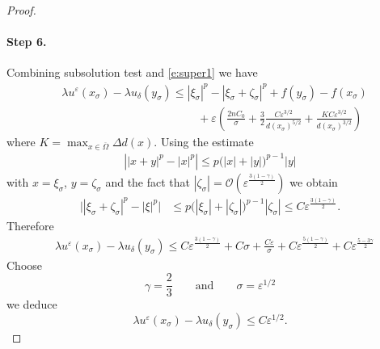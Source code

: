 \documentclass[11pt,reqno]{amsart}
\numberwithin{figure}{section}
\theoremstyle{plain}
\theoremstyle{remark}
\numberwithin{equation}{section}
\begin{document}
\begin{proof}
\paragraph{Step 6.} Combining subsolution test and \eqref{e:super1} we have
\begin{align}
    &\lambda u^\varepsilon(x_\sigma) - \lambda u_\delta(y_\sigma) \leq |\xi_\sigma|^p - |\xi_\sigma+\zeta_\sigma|^p + f(y_\sigma) - f(x_\sigma) \nonumber \\
    & \qquad\qquad\qquad\qquad\qquad\qquad + \varepsilon \left(\frac{2nC_0}{\sigma} + \frac{3}{2}\frac{C\varepsilon^{3/2}}{d(x_\sigma)^{5/2}} + \frac{KC\varepsilon^{3/2}}{d(x_\sigma)^{3/2}}\right) 
\end{align}
where $K = \max_{x\in \overline{\Omega}}\Delta d(x)$. Using the estimate
\begin{align*}
    \left||x+y|^p - |x|^p \right| \leq  p\big(|x|+|y|\big)^{p-1}|y|
\end{align*}
with $x = \xi_\sigma$, $y = \zeta_\sigma$ and the fact that $|\zeta_\sigma| = \mathcal{O}\left(\varepsilon^{\frac{3(1-\gamma)}{2}}\right)$ we obtain
\begin{align}
    \Big||\xi_\sigma+\zeta_\sigma|^p - |\xi|^p\Big| &\leq p\Big(|\xi_\sigma|+|\zeta_\sigma|\Big)^{p-1}|\zeta_\sigma| \leq C\varepsilon^{\frac{3(1-\gamma)}{2}}.\label{e:est2}
\end{align}
Therefore
\begin{align*}
     &\lambda u^\varepsilon(x_\sigma) - \lambda u_\delta(y_\sigma) \leq C\varepsilon^{\frac{3(1-\gamma)}{2}} + C\sigma + \frac{C\varepsilon}{\sigma} + C \varepsilon^{\frac{5(1-\gamma)}{2}} + C\varepsilon ^{\frac{5-3\gamma}{2}}
\end{align*}
Choose 
\begin{equation*}
    \gamma = \frac{2}{3} \qquad\text{and}\qquad \sigma = \varepsilon^{1/2}
\end{equation*}
we deduce
\begin{equation*}
    \lambda u^\varepsilon(x_\sigma) - \lambda u_\delta(y_\sigma) \leq C\varepsilon^{1/2}.
\end{equation*}
\end{proof} 



{}
%

\end{document}
